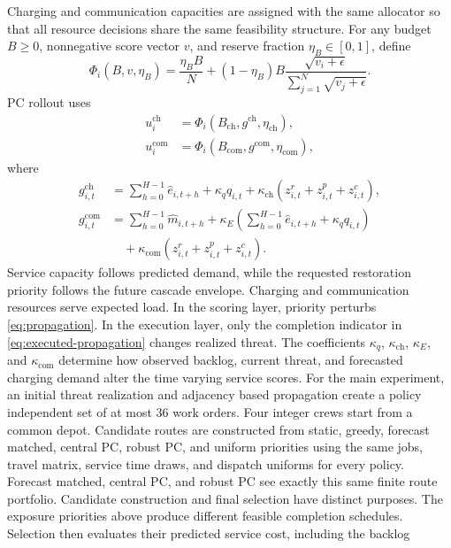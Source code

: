 \documentclass[journal]{IEEEtran}
\begin{document}
Charging and communication capacities are assigned with the same allocator so
that all resource decisions share the same feasibility structure.  For any
budget $B\ge0$, nonnegative score vector $v$, and reserve fraction
$\eta_B\in[0,1]$, define
\begin{equation}
\Phi_i(B,v,\eta_B)=
\frac{\eta_B B}{N}
+(1-\eta_B)B
\frac{\sqrt{v_i+\epsilon}}
{\sum_{j=1}^{N}\sqrt{v_j+\epsilon}}.
\label{eq:allocator}
\end{equation}
PC rollout uses
\begin{align}
u_i^{\mathrm{ch}}&=\Phi_i(B_{\mathrm{ch}},g^{\mathrm{ch}},\eta_{\mathrm{ch}}),\\
u_i^{\mathrm{com}}&=\Phi_i(B_{\mathrm{com}},g^{\mathrm{com}},\eta_{\mathrm{com}}),
\end{align}
where
\begin{align}
g_{i,t}^{\mathrm{ch}}
&=\sum_{h=0}^{H-1}\hat e_{i,t+h}+\kappa_q q_{i,t}
+\kappa_{\mathrm{ch}}
\left(z_{i,t}^{r}+z_{i,t}^{p}+z_{i,t}^{c}\right),\\
g_{i,t}^{\mathrm{com}}
&=\sum_{h=0}^{H-1}\hat m_{i,t+h}
+\kappa_E\left(\sum_{h=0}^{H-1}\hat e_{i,t+h}+\kappa_q q_{i,t}\right) \nonumber\\
&\quad+\kappa_{\mathrm{com}}
\left(z_{i,t}^{r}+z_{i,t}^{p}+z_{i,t}^{c}\right).
\end{align}
Service capacity follows predicted demand, while the requested restoration
priority follows the future cascade envelope.  Charging and communication
resources serve expected load.  In the scoring layer, priority perturbs
\eqref{eq:propagation}.  In the execution layer, only the completion indicator
in \eqref{eq:executed-propagation} changes realized threat.
The coefficients $\kappa_q$, $\kappa_{\mathrm{ch}}$, $\kappa_E$, and
$\kappa_{\mathrm{com}}$ determine how observed backlog, current threat, and
forecasted charging demand alter the time varying service scores.  For the main
experiment, an initial threat realization and adjacency based propagation
create a policy independent set of at most 36 work orders.  Four integer crews
start from a common depot.  Candidate routes are constructed from static,
greedy, forecast matched, central PC, robust PC, and uniform priorities using
the same jobs, travel matrix, service time draws, and dispatch uniforms for
every policy.
Forecast matched, central PC, and robust PC see exactly this same finite route
portfolio.  Candidate construction and final selection have distinct purposes.
The exposure priorities above produce different feasible completion schedules.
Selection then evaluates their predicted service cost, including the backlog
\end{document}
